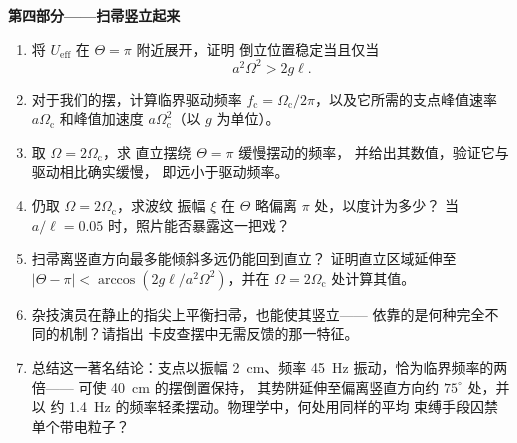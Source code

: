 \begin{problem}
\medskip\noindent\textbf{第四部分——扫帚竖立起来}
\begin{enumerate}[resume]
  \item 将 $U_{\text{eff}}$ 在 $\Theta = \pi$ 附近展开，证明
        倒立位置稳定当且仅当
        \[
        a^2\Omega^2 > 2g\ell .
        \]
  \item 对于我们的摆，计算临界驱动频率 $f_{\text{c}} =
        \Omega_{\text{c}}/2\pi$，以及它所需的支点峰值速率
        $a\Omega_{\text{c}}$ 和峰值加速度
        $a\Omega_{\text{c}}^2$（以 $g$ 为单位）。
  \item 取 $\Omega = 2\Omega_{\text{c}}$，求
        直立摆绕 $\Theta = \pi$ 缓慢摆动的频率，
        并给出其数值，验证它与驱动相比确实缓慢，
        即远小于驱动频率。
  \item 仍取 $\Omega = 2\Omega_{\text{c}}$，求波纹
        振幅 $\xi$ 在 $\Theta$ 略偏离 $\pi$ 处，以度计为多少？
        当 $a/\ell = 0.05$ 时，照片能否暴露这一把戏？
  \item 扫帚离竖直方向最多能倾斜多远仍能回到直立？
        证明直立区域延伸至 $|\Theta - \pi| <
        \arccos(2g\ell/a^2\Omega^2)$，并在 $\Omega =
        2\Omega_{\text{c}}$ 处计算其值。
  \item 杂技演员在静止的指尖上平衡扫帚，也能使其竖立——
        依靠的是何种完全不同的机制？请指出
        卡皮查摆中无需反馈的那一特征。
  \item 总结这一著名结论：支点以振幅
        \qty{2}{cm}、频率 \qty{45}{Hz} 振动，恰为临界频率的两倍——
        可使 \qty{40}{cm} 的摆倒置保持，
        其势阱延伸至偏离竖直方向约 $75^\circ$ 处，并以
        约 \qty{1.4}{Hz} 的频率轻柔摆动。物理学中，何处用同样的平均
        束缚手段囚禁单个带电粒子？
\end{enumerate}
\end{problem}
